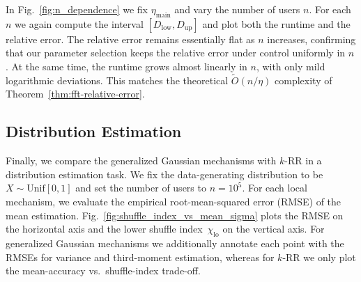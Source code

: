 \documentclass{article}
\theoremstyle{plain}
\theoremstyle{definition}
\begin{document}
In Fig.~\ref{fig:n_dependence} we fix $\eta_{\mathrm{main}}$ and vary the number of users $n$.
For each $n$ we again compute the interval
$[D_{\mathrm{low}},D_{\mathrm{up}}]$ and plot both the runtime and the
relative error.
The relative error remains essentially flat as $n$ increases, confirming
that our parameter selection keeps the relative error under control uniformly
in $n$.
At the same time, the runtime grows almost linearly in $n$, with only mild
logarithmic deviations.
This matches the theoretical $\widetilde O(n/\eta)$ complexity of
Theorem~\ref{thm:fft-relative-error}.




\subsection{Distribution Estimation}
\label{sec:distribution-estimation}
Finally, we compare the generalized Gaussian mechanisms with $k$-RR in a distribution estimation task.
We fix the data-generating distribution to be $X \sim \mathrm{Unif}[0,1]$ and set the number of users to $n = 10^5$.
For each local mechanism, we evaluate the empirical root-mean-squared error (RMSE) of the mean estimation.
Fig.~\ref{fig:shuffle_index_vs_mean_sigma} plots the RMSE on the horizontal axis and the lower shuffle index~$\chi_{\mathrm{lo}}$ on the vertical axis.
For generalized Gaussian mechanisms we additionally annotate each point with the RMSEs for variance and third-moment estimation, whereas for $k$-RR we only plot the mean-accuracy vs.\ shuffle-index trade-off.
\end{document}
